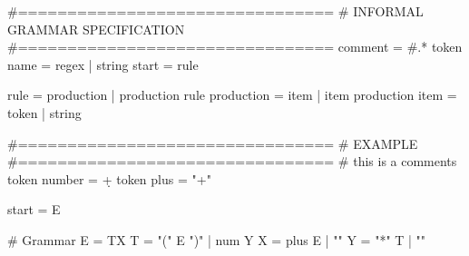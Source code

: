 \begin{python}
#================================
# INFORMAL GRAMMAR SPECIFICATION
#================================
comment = #.*\n
token name = regex | string
start = rule

rule = production | production rule
production = item | item production
item = token | string

#================================
# EXAMPLE
#================================
# this is a comments
token number = \d+
token plus = "+"

start = E

# Grammar
E = TX
T = "(" E ")" | num Y
X = plus E | ""
Y = "*" T  | ""
\end{python}
